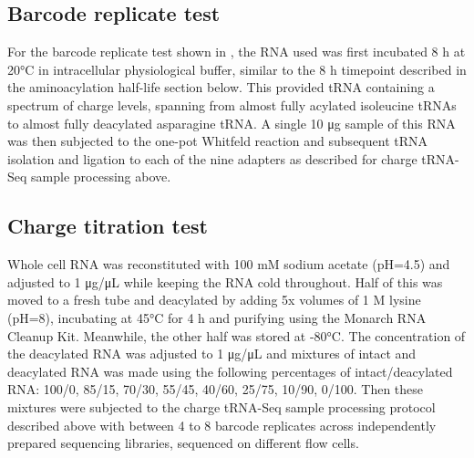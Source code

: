 \documentclass[9pt,lineno]{elife}
\begin{document}
\subsection{Barcode replicate test}
For the barcode replicate test shown in , the RNA used was first incubated 8 h at 20°C in intracellular physiological buffer, similar to the 8 h timepoint described in the aminoacylation half-life section below.
This provided tRNA containing a spectrum of charge levels, spanning from almost fully acylated isoleucine tRNAs to almost fully deacylated asparagine tRNA.
A single 10 μg sample of this RNA was then subjected to the one-pot Whitfeld reaction and subsequent tRNA isolation and ligation to each of the nine adapters as described for charge tRNA-Seq sample processing above.



\subsection{Charge titration test}
Whole cell RNA was reconstituted with 100 mM sodium acetate (pH=4.5) and adjusted to 1 μg/μL while keeping the RNA cold throughout.
Half of this was moved to a fresh tube and deacylated by adding 5x volumes of 1 M lysine (pH=8), incubating at 45°C for 4 h and purifying using the Monarch RNA Cleanup Kit.
Meanwhile, the other half was stored at -80°C.
The concentration of the deacylated RNA was adjusted to 1 μg/μL and mixtures of intact and deacylated RNA was made using the following percentages of intact/deacylated RNA: 100/0, 85/15, 70/30, 55/45, 40/60, 25/75, 10/90, 0/100.
Then these mixtures were subjected to the charge tRNA-Seq sample processing protocol described above with between 4 to 8 barcode replicates across independently prepared sequencing libraries, sequenced on different flow cells.
\end{document}
